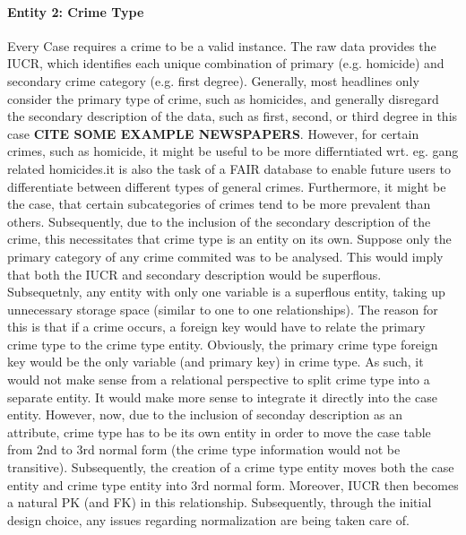 \documentclass[a4paper]{article}
\begin{document}
\paragraph{Entity 2: Crime Type} Every Case requires a crime to be a valid instance. The raw data provides the IUCR, which identifies each unique combination of primary (e.g. homicide) and secondary crime category (e.g. first degree). Generally, most headlines only consider the primary type of crime, such as homicides, and generally disregard the secondary description of the data, such as first, second, or third degree in this case \textbf{CITE SOME EXAMPLE NEWSPAPERS}. However, for certain crimes, such as homicide, it might be useful to be more differntiated wrt. eg. gang related homicides.it is also the task of a FAIR database to enable future users to differentiate between different types of general crimes. Furthermore, it might be the case, that certain subcategories of crimes tend to be more prevalent than others.
Subsequently, due to the inclusion of the secondary description of the crime, this necessitates that crime type is an entity on its own. Suppose only the primary category of any crime commited was to be analysed. This would imply that both the IUCR and secondary description would be superflous. Subsequetnly, any entity with only one variable is a superflous entity, taking up unnecessary storage space (similar to one to one relationships). The reason for this is that if a crime occurs, a foreign key would have to relate the primary crime type to the crime type entity. Obviously, the primary crime type foreign key would be the only variable (and primary key) in crime type. As such, it would not make sense from a relational perspective to split crime type into a separate entity. It would make more sense to integrate it directly into the case entity. However, now, due to the inclusion of seconday description as an attribute, crime type has to be its own entity in order to move the case table from 2nd to 3rd normal form (the crime type information would not be transitive). Subsequently, the creation of a crime type entity moves both the case entity and crime type entity into 3rd normal form. Moreover, IUCR then becomes a natural PK (and FK) in this relationship. Subsequently, through the initial design choice, any issues regarding normalization are being taken care of. 
\end{document}
